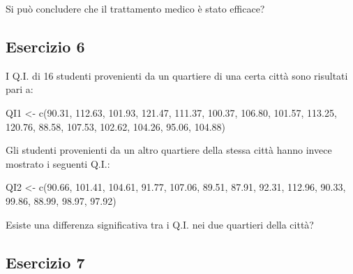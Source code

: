 \documentclass[a4paper,12pt,oneside]{book}
\newenvironment{Shaded}{\begin{snugshade}}{\end{snugshade}}
\newcommand{\FloatTok}[1]{#1}
\newcommand{\OtherTok}[1]{#1}
\newcommand{\FunctionTok}[1]{#1}
\newcommand{\NormalTok}[1]{#1}
\begin{document}
Si può concludere che il trattamento medico è stato efficace?

\hypertarget{esercizio-6-2}{%
\subsection{Esercizio 6}\label{esercizio-6-2}}

I Q.I. di 16 studenti provenienti da un quartiere di una certa città sono risultati pari a:

\begin{Shaded}
\begin{Highlighting}[]
\NormalTok{QI1 }\OtherTok{\textless{}{-}} \FunctionTok{c}\NormalTok{(}\FloatTok{90.31}\NormalTok{, }\FloatTok{112.63}\NormalTok{, }\FloatTok{101.93}\NormalTok{, }\FloatTok{121.47}\NormalTok{, }\FloatTok{111.37}\NormalTok{, }\FloatTok{100.37}\NormalTok{, }\FloatTok{106.80}\NormalTok{,}
         \FloatTok{101.57}\NormalTok{, }\FloatTok{113.25}\NormalTok{, }\FloatTok{120.76}\NormalTok{,  }\FloatTok{88.58}\NormalTok{, }\FloatTok{107.53}\NormalTok{, }\FloatTok{102.62}\NormalTok{, }\FloatTok{104.26}\NormalTok{,}
         \FloatTok{95.06}\NormalTok{, }\FloatTok{104.88}\NormalTok{)}
\end{Highlighting}
\end{Shaded}

Gli studenti provenienti da un altro quartiere della stessa città hanno invece mostrato i seguenti Q.I.:

\begin{Shaded}
\begin{Highlighting}[]
\NormalTok{QI2 }\OtherTok{\textless{}{-}} \FunctionTok{c}\NormalTok{(}\FloatTok{90.66}\NormalTok{, }\FloatTok{101.41}\NormalTok{, }\FloatTok{104.61}\NormalTok{,  }\FloatTok{91.77}\NormalTok{, }\FloatTok{107.06}\NormalTok{,  }\FloatTok{89.51}\NormalTok{,  }\FloatTok{87.91}\NormalTok{,}
         \FloatTok{92.31}\NormalTok{, }\FloatTok{112.96}\NormalTok{,  }\FloatTok{90.33}\NormalTok{,  }\FloatTok{99.86}\NormalTok{,  }\FloatTok{88.99}\NormalTok{,  }\FloatTok{98.97}\NormalTok{,  }\FloatTok{97.92}\NormalTok{)}
\end{Highlighting}
\end{Shaded}

Esiste una differenza significativa tra i Q.I. nei due quartieri della città?

\hypertarget{esercizio-7-1}{%
\subsection{Esercizio 7}\label{esercizio-7-1}}
\end{document}
